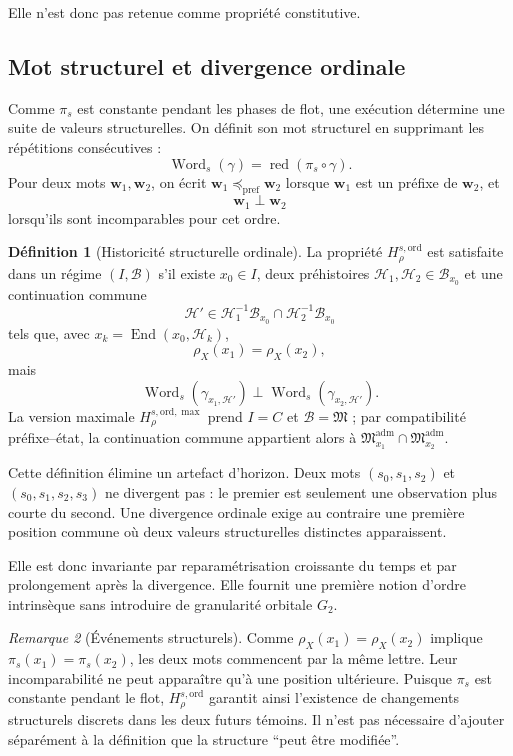\documentclass[11pt,a4paper]{article}
\theoremstyle{definition}
\newtheorem{definition}{Définition}[section]
\theoremstyle{remark}
\newtheorem{remark}[definition]{Remarque}
\newcommand{\M}{\mathfrak M}
\newcommand{\Madm}{\mathfrak M^{\mathrm{adm}}}
\newcommand{\End}{\operatorname{End}}
\newcommand{\Word}{\operatorname{Word}}
\begin{document}
Elle n'est donc pas retenue comme propriété constitutive.

\subsection{Mot structurel et divergence ordinale}

Comme $\pi_s$ est constante pendant les phases de flot, une exécution détermine une suite de valeurs structurelles. On définit son mot structurel en supprimant les répétitions consécutives :
\[
\Word_s(\gamma)=\operatorname{red}(\pi_s\circ\gamma).
\]
Pour deux mots $\mathbf w_1,\mathbf w_2$, on écrit $\mathbf w_1\preceq_{\mathrm{pref}}\mathbf w_2$ lorsque $\mathbf w_1$ est un préfixe de $\mathbf w_2$, et
\[
\mathbf w_1\perp\mathbf w_2
\]
lorsqu'ils sont incomparables pour cet ordre.

\begin{definition}[Historicité structurelle ordinale]
La propriété $H_{\rho}^{s,\mathrm{ord}}$ est satisfaite dans un régime $(I,\mathcal B)$ s'il existe $x_0\in I$, deux préhistoires $\mathcal H_1,\mathcal H_2\in\mathcal B_{x_0}$ et une continuation commune
\[
\mathcal H'\in\mathcal H_1^{-1}\mathcal B_{x_0}\cap\mathcal H_2^{-1}\mathcal B_{x_0}
\]
tels que, avec $x_k=\End(x_0,\mathcal H_k)$,
\[
\rho_X(x_1)=\rho_X(x_2),
\]
mais
\[
\boxed{
\Word_s(\gamma_{x_1,\mathcal H'})
\perp
\Word_s(\gamma_{x_2,\mathcal H'}).}
\]
La version maximale $H_{\rho}^{s,\mathrm{ord},\max}$ prend $I=C$ et $\mathcal B=\M$ ; par compatibilité préfixe--état, la continuation commune appartient alors à $\Madm_{x_1}\cap\Madm_{x_2}$.
\end{definition}

Cette définition élimine un artefact d'horizon. Deux mots $(s_0,s_1,s_2)$ et $(s_0,s_1,s_2,s_3)$ ne divergent pas : le premier est seulement une observation plus courte du second. Une divergence ordinale exige au contraire une première position commune où deux valeurs structurelles distinctes apparaissent.

Elle est donc invariante par reparamétrisation croissante du temps et par prolongement après la divergence. Elle fournit une première notion d'ordre intrinsèque sans introduire de granularité orbitale $G_2$.

\begin{remark}[Événements structurels]
Comme $\rho_X(x_1)=\rho_X(x_2)$ implique $\pi_s(x_1)=\pi_s(x_2)$, les deux mots commencent par la même lettre. Leur incomparabilité ne peut apparaître qu'à une position ultérieure. Puisque $\pi_s$ est constante pendant le flot, $H_{\rho}^{s,\mathrm{ord}}$ garantit ainsi l'existence de changements structurels discrets dans les deux futurs témoins. Il n'est pas nécessaire d'ajouter séparément à la définition que la structure ``peut être modifiée''.
\end{remark}
\end{document}
